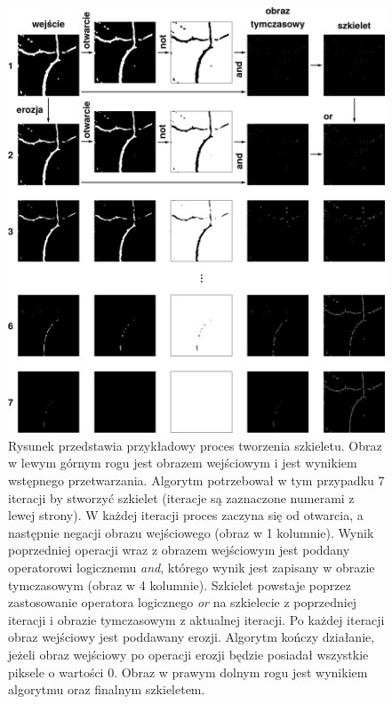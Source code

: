 \begin{figure}[H]
  \centering
  \includegraphics[width=\textwidth]{gfx/skeleton}
  \caption{Rysunek przedstawia przykładowy proces tworzenia szkieletu. Obraz w lewym górnym rogu jest obrazem wejściowym i jest wynikiem wstępnego przetwarzania. Algorytm potrzebował w tym przypadku 7 iteracji by stworzyć szkielet (iteracje są zaznaczone numerami z lewej strony). W każdej iteracji proces zaczyna się od otwarcia, a następnie negacji obrazu wejściowego (obraz w 1 kolumnie). Wynik poprzedniej operacji wraz z obrazem wejściowym jest poddany operatorowi logicznemu \textit{and}, którego wynik jest zapisany w obrazie tymczasowym (obraz w 4 kolumnie). Szkielet powstaje poprzez zastosowanie operatora logicznego \textit{or} na szkielecie z poprzedniej iteracji i obrazie tymczasowym z aktualnej iteracji. Po każdej iteracji obraz wejściowy jest poddawany erozji. Algorytm kończy działanie, jeżeli obraz wejściowy po operacji erozji będzie posiadał wszystkie piksele o wartości 0. Obraz w prawym dolnym rogu jest wynikiem algorytmu oraz finalnym szkieletem.}
  \label{fig:proponowane_algorytmy:skeleton}
\end{figure}

